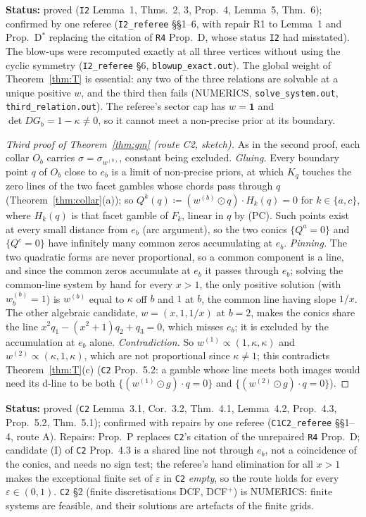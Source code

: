 \documentclass[11pt]{article}
\theoremstyle{definition}
\theoremstyle{remark}
\newcommand{\one}{\mathbf 1}
\newcommand{\src}[1]{\texttt{#1}}
\newcommand{\status}[1]{\par\smallskip\noindent\textbf{Status:} #1\par\smallskip}
\begin{document}
\status{proved (\src{I2} Lemma~1, Thms.~2, 3, Prop.~4, Lemma~5, Thm.~6); confirmed by one referee (\src{I2\_referee} \S\S1--6, with repair R1 to Lemma~1 and Prop.~D$^*$ replacing the citation of \src{R4} Prop.~D, whose status \src{I2} had misstated). The blow-ups were recomputed exactly at all three vertices without using the cyclic symmetry (\src{I2\_referee} \S6, \texttt{blowup\_exact.out}). The global weight of Theorem~\ref{thm:T} is essential: any two of the three relations are solvable at a unique positive $w$, and the third then fails (NUMERICS, \texttt{solve\_system.out}, \texttt{third\_relation.out}). The referee's sector cap has $w=\one$ and $\det DG_b=1-\kappa\ne0$, so it cannot meet a non-precise prior at its boundary.}

\begin{proof}[Third proof of Theorem~\ref{thm:gm} (route C2, sketch)]
As in the second proof, each collar $O_b$ carries $\sigma=\sigma_{w^{(b)}}$, constant being excluded. \emph{Gluing.} Every boundary point $q$ of $O_b$ close to $e_b$ is a limit of non-precise priors, at which $K_q$ touches the zero lines of the two facet gambles whose chords pass through $q$ (Theorem~\ref{thm:collar}(a)); so $Q^k(q)\coloneqq(w^{(b)}\odot q)\cdot H_k(q)=0$ for $k\in\{a,c\}$, where $H_k(q)$ is that facet gamble of $F_k$, linear in $q$ by (PC). Such points exist at every small distance from $e_b$ (arc argument), so the two conics $\{Q^a=0\}$ and $\{Q^c=0\}$ have infinitely many common zeros accumulating at $e_b$. \emph{Pinning.} The two quadratic forms are never proportional, so a common component is a line, and since the common zeros accumulate at $e_b$ it passes through $e_b$; solving the common-line system by hand for every $x>1$, the only positive solution (with $w^{(b)}_b=1$) is $w^{(b)}$ equal to $\kappa$ off $b$ and $1$ at $b$, the common line having slope $1/x$. The other algebraic candidate, $w=(x,1,1/x)$ at $b=2$, makes the conics share the line $x^2q_1-(x^2+1)q_2+q_3=0$, which misses $e_b$; it is excluded by the accumulation at $e_b$ alone. \emph{Contradiction.} So $w^{(1)}\propto(1,\kappa,\kappa)$ and $w^{(2)}\propto(\kappa,1,\kappa)$, which are not proportional since $\kappa\ne1$; this contradicts Theorem~\ref{thm:T}(c) (\src{C2} Prop.~5.2: a gamble whose line meets both images would need its d-line to be both $\{(w^{(1)}\odot g)\cdot q=0\}$ and $\{(w^{(2)}\odot g)\cdot q=0\}$).
\end{proof}
\status{proved (\src{C2} Lemma~3.1, Cor.~3.2, Thm.~4.1, Lemma~4.2, Prop.~4.3, Prop.~5.2, Thm.~5.1); confirmed with repairs by one referee (\src{C1C2\_referee} \S\S1--4, route A). Repairs: Prop.~P replaces \src{C2}'s citation of the unrepaired \src{R4} Prop.~D; candidate (I) of \src{C2} Prop.~4.3 is a shared line not through $e_b$, not a coincidence of the conics, and needs no sign test; the referee's hand elimination for all $x>1$ makes the exceptional finite set of $\varepsilon$ in \src{C2} \emph{empty}, so the route holds for every $\varepsilon\in(0,1)$. \src{C2} \S2 (finite discretisations DCF, DCF$^+$) is NUMERICS: finite systems are feasible, and their solutions are artefacts of the finite grids.}
\end{document}
